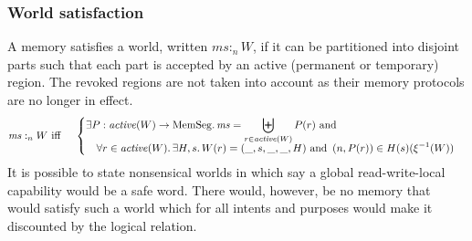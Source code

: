 \documentclass[acmsmall,review]{acmart}\settopmatter{printfolios=true}
\DeclareMathOperator{\dom}{dom}
\newcommand{\var}[1]{\mathit{#1}}
\newcommand{\hs}{\var{ms}}
\newcommand{\ms}{\hs}
\newcommand{\heap}{\var{mem}}
\newcommand{\plainfun}[2]{
  \ifthenelse{\equal{#2}{}}
  {\mathit{#1}}
  {\mathit{#1}(#2)}
}
\newcommand{\activeReg}[1]{\plainfun{active}{#1}}
\newcommand{\futurewk}{\mathbin{\sqsupseteq}^{\var{pub}}}
\newcommand{\futurestr}{\mathbin{\sqsupseteq}^{\var{priv}}}
\newcommand{\heapSat}[3][\heap]{#1 :_{#2} #3}
\newcommand{\memSat}[3][n]{\heapSat[#2]{#1}{#3}}
\newcommand{\plaindom}[1]{\mathrm{#1}}
\newcommand{\HeapSegments}{\plaindom{MemSeg}}
\newcommand{\npair}[2][n]{\left(#1,#2 \right)}
\begin{document}


\subsubsection{World satisfaction}
A memory satisfies a world, written $\memSat{\ms}{W}$, if it can be partitioned
into disjoint parts such that each part is accepted by an active (permanent or
temporary) region. The revoked regions are not taken into account as their memory protocols are no longer in effect.
\begin{align*}
  &\memSat{\ms}{W}
    \text{ iff }\quad \left\{\begin{aligned}
        &\exists P : \activeReg{W} \rightarrow \HeapSegments \ldotp \hs = \biguplus_{r\in\activeReg{W}}P(r) \text{ and } \\[-.2cm]
        &\quad \forall r \in \activeReg{W} \ldotp \exists H,s \ldotp W(r) = (\_,s,\_,\_,H) \text{ and } \npair[n]{P(r)} \in H(s)(\xi^{-1}(W))\\
      \end{aligned}\right.
\end{align*}
It is possible to state nonsensical worlds in which say a global
read-write-local capability would be a safe word. There would, however, be no
memory that would satisfy such a world which for all intents and purposes would
make it discounted by the logical relation.
\end{document}
